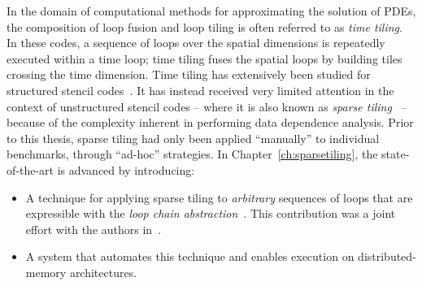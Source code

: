 In the domain of computational methods for approximating the solution of PDEs, the composition of loop fusion and loop tiling is often referred to as {\em time tiling}. In these codes, a sequence of loops over the spatial dimensions is repeatedly executed within a time loop; time tiling fuses the spatial loops by building tiles crossing the time dimension. Time tiling has extensively been studied for structured stencil codes~\citep{cohen-timetiling,ics-stencil-tiling,Zhou12,pluto}. It has instead received very limited attention in the context of unstructured stencil codes -- where it is also known as {\em sparse tiling}~\citep{ST-StroutLCPC2002} -- because of the complexity inherent in performing data dependence analysis. Prior to this thesis, sparse tiling had only been applied ``manually'' to individual benchmarks, through ``ad-hoc'' strategies. In Chapter~\ref{ch:sparsetiling}, the state-of-the-art is advanced by introducing:
\begin{itemize}
\item A technique for applying sparse tiling to {\it arbitrary} sequences of loops that are expressible with the {\em loop chain abstraction}~\citep{ST-KriegerHIPS2013}. This contribution was a joint effort with the authors in~\cite{st-paper}.
\item A system that automates this technique and enables execution on distributed-memory architectures.
\end{itemize}

